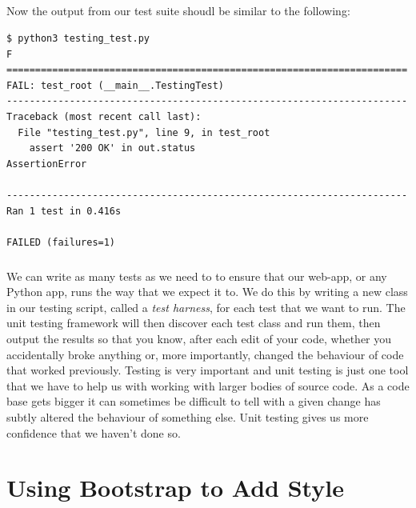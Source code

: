 \documentclass[12pt, a4paper, oneside]{book}
\begin{document}
{\paragraph{} Now the output from our test suite shoudl be similar to the following:

\begin{lstlisting}[style=DOS]
$ python3 testing_test.py 
F
======================================================================
FAIL: test_root (__main__.TestingTest)
----------------------------------------------------------------------
Traceback (most recent call last):
  File "testing_test.py", line 9, in test_root
    assert '200 OK' in out.status
AssertionError

----------------------------------------------------------------------
Ran 1 test in 0.416s

FAILED (failures=1)
\end{lstlisting}

\paragraph{} We can write as many tests as we need to to ensure that our web-app, or any Python app, runs the way that we expect it to. We do this by writing a new class in our testing script, called a \emph{test harness}, for each test that we want to run. The unit testing framework will then discover each test class and run them, then output the results so that you know, after each edit of your code, whether you accidentally broke anything or, more importantly, changed the behaviour of code that worked previously. Testing is very important and unit testing is just one tool that we have to help us with working with larger bodies of source code. As a code base gets bigger it can sometimes be difficult to tell with a given change has subtly altered the behaviour of something else. Unit testing gives us more confidence that we haven't done so.



\chapter{Using Bootstrap to Add Style}
\label{lab07}
}
\end{document}
